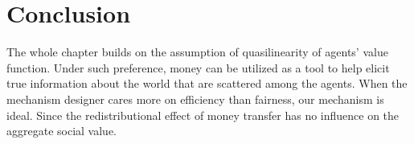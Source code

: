 \section{Conclusion}

The whole chapter builds on the assumption of quasilinearity of agents' value function. Under such preference,  money can be utilized 
as a tool to help elicit true information about the world that are scattered among the agents.
When the mechanism designer cares more on efficiency than fairness, our mechanism is ideal. Since the redistributional effect of money 
transfer has no influence on the aggregate social value.






